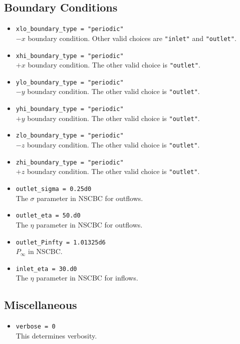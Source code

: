 \documentclass[11pt,letterpaper]{article}
\begin{document}
\subsection{Boundary Conditions}

\begin{itemize}
\item {\tt xlo\_boundary\_type = "periodic"}\\
  $-x$ boundary condition.  Other valid choices are {\tt "inlet"} and
  {\tt "outlet"}.
\item {\tt xhi\_boundary\_type = "periodic"}\\
  $+x$ boundary condition.  The other valid choice is {\tt "outlet"}.
\item {\tt ylo\_boundary\_type = "periodic"}\\
  $-y$ boundary condition.  The other valid choice is {\tt "outlet"}.
\item {\tt yhi\_boundary\_type = "periodic"}\\
  $+y$ boundary condition.  The other valid choice is {\tt "outlet"}.
\item {\tt zlo\_boundary\_type = "periodic"}\\
  $-z$ boundary condition.  The other valid choice is {\tt "outlet"}.
\item {\tt zhi\_boundary\_type = "periodic"}\\
  $+z$ boundary condition.  The other valid choice is {\tt "outlet"}.
\item {\tt outlet\_sigma = 0.25d0}\\
  The $\sigma$ parameter in NSCBC for outflows.
\item {\tt outlet\_eta = 50.d0}\\
  The $\eta$ parameter in NSCBC for outflows.
\item {\tt outlet\_Pinfty = 1.01325d6}\\
  $P_\infty$ in NSCBC.
\item {\tt inlet\_eta = 30.d0}\\
  The $\eta$ parameter in NSCBC for inflows.
\end{itemize}

\subsection{Miscellaneous}

\begin{itemize}
\item {\tt verbose = 0}\\
  This determines verbosity.
\end{itemize}
\end{document}
